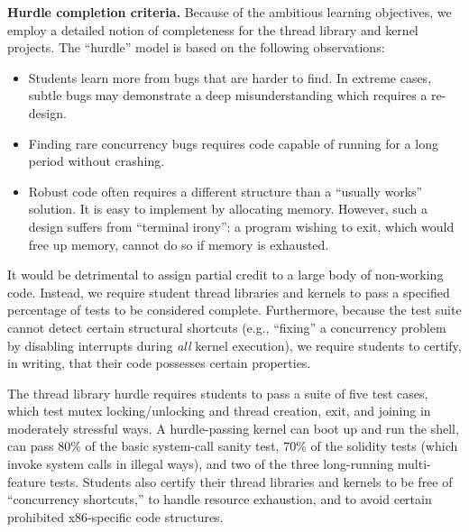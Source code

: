 \textbf{Hurdle completion criteria.}
Because of the ambitious learning objectives,
we employ a detailed notion of completeness
for the thread library and kernel projects.
The ``hurdle'' model is based on the following observations:

\begin{itemize}
	\item Students learn more from bugs
		that are harder to find.
		In extreme cases, %
		subtle bugs may
		demonstrate a deep misunderstanding which requires a re-design.

	\item %
		Finding rare concurrency bugs requires code capable of running
		for a long period without crashing.

	\item Robust code often requires a different structure
		than a ``usually works'' solution.
		It is easy to %
		implement  by
		allocating memory. %
		However, such a design suffers from ``terminal irony'':
		a program wishing to exit,
		which would free up memory,
		cannot do so if memory is exhausted.
\end{itemize}

It would be detrimental to
assign partial credit to a large body of non-working
code.
Instead, we require student thread libraries and kernels to pass a
specified percentage of tests
to be considered complete.
Furthermore,
because the test suite cannot detect certain
structural shortcuts (e.g., ``fixing'' a concurrency
problem by disabling interrupts during \textit{all}
kernel execution),
we require students to certify, in writing, that
their code possesses certain properties.

The thread library hurdle requires students to pass a suite of five test cases,
which test mutex locking/unlocking and thread creation, exit, and joining in moderately stressful ways.
%
A hurdle-passing kernel can boot up and run the shell,
can pass 80\% of the basic system-call sanity test,
70\% of the solidity tests (which
invoke system calls in illegal
ways),
and two of the three long-running multi-feature tests.
Students also certify their thread libraries and kernels to
be free of ``concurrency shortcuts,''
to handle resource exhaustion,
and to avoid certain prohibited x86-specific code structures.

